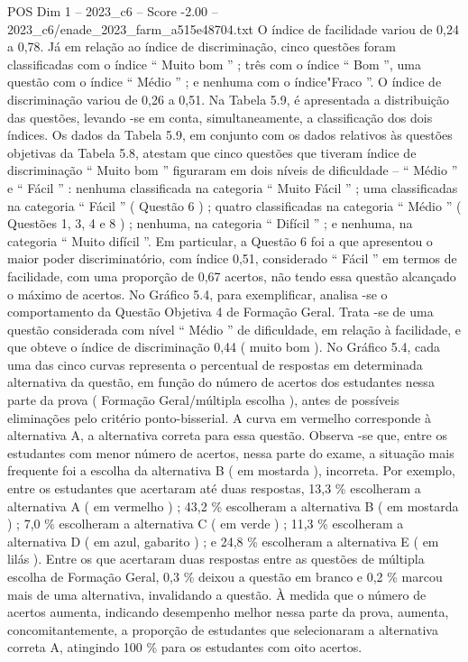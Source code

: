 \begin{textsample}{POS Dim 1 – 2023\_c6 – Score -2.00 – 2023\_c6/enade\_2023\_farm\_a515e48704.txt}
O índice de facilidade variou de 0,24 a 0,78.
Já em relação ao índice de discriminação, cinco questões foram classificadas com o índice “ Muito bom ” ; três com o índice “ Bom ”, uma questão com o índice “ Médio ” ; e nenhuma com o índice"Fraco ”.
O índice de discriminação variou de 0,26 a 0,51.
Na Tabela 5.9, é apresentada a distribuição das questões, levando -se em conta, simultaneamente, a classificação dos dois índices.
Os dados da Tabela 5.9, em conjunto com os dados relativos às questões objetivas da Tabela 5.8, atestam que cinco questões que tiveram índice de discriminação “ Muito bom ” figuraram em dois níveis de dificuldade – “ Médio ” e “ Fácil ” : nenhuma classificada na categoria “ Muito Fácil ” ; uma classificadas na categoria “ Fácil ” ( Questão 6 ) ; quatro classificadas na categoria “ Médio ” ( Questões 1, 3, 4 e 8 ) ; nenhuma, na categoria “ Difícil ” ; e nenhuma, na categoria “ Muito difícil ”.
Em particular, a Questão 6 foi a que apresentou o maior poder discriminatório, com índice 0,51, considerado “ Fácil ” em termos de facilidade, com uma proporção de 0,67 acertos, não tendo essa questão alcançado o máximo de acertos.
No Gráfico 5.4, para exemplificar, analisa -se o comportamento da Questão Objetiva 4 de Formação Geral.
Trata -se de uma questão considerada com nível “ Médio ” de dificuldade, em relação à facilidade, e que obteve o índice de discriminação 0,44 ( muito bom ).
No Gráfico 5.4, cada uma das cinco curvas representa o percentual de respostas em determinada alternativa da questão, em função do número de acertos dos estudantes nessa parte da prova ( Formação Geral/múltipla escolha ), antes de possíveis eliminações pelo critério ponto-bisserial.
A curva em vermelho corresponde à alternativa A, a alternativa correta para essa questão.
Observa -se que, entre os estudantes com menor número de acertos, nessa parte do exame, a situação mais frequente foi a escolha da alternativa B ( em mostarda ), incorreta.
Por exemplo, entre os estudantes que acertaram até duas respostas, 13,3 \% escolheram a alternativa A ( em vermelho ) ; 43,2 \% escolheram a alternativa B ( em mostarda ) ; 7,0 \% escolheram a alternativa C ( em verde ) ; 11,3 \% escolheram a alternativa D ( em azul, gabarito ) ; e 24,8 \% escolheram a alternativa E ( em lilás ).
Entre os que acertaram duas respostas entre as questões de múltipla escolha de Formação Geral, 0,3 \% deixou a questão em branco e 0,2 \% marcou mais de uma alternativa, invalidando a questão.
À medida que o número de acertos aumenta, indicando desempenho melhor nessa parte da prova, aumenta, concomitantemente, a proporção de estudantes que selecionaram a alternativa correta A, atingindo 100 \% para os estudantes com oito acertos.

\end{textsample}
